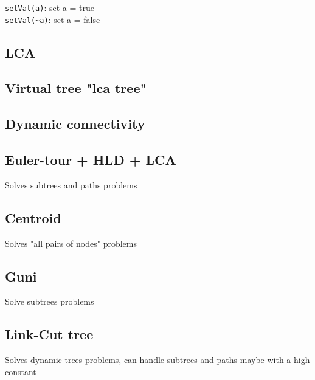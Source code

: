 \lstinline{setVal(a)}: set a = true \\
\lstinline{setVal(~a)}: set a = false \\

\subsection{LCA }

\subsection{Virtual tree  "lca tree"}


\subsection{Dynamic connectivity }

\subsection{Euler-tour + HLD + LCA }

Solves subtrees and paths problems \\


\subsection{Centroid }

Solves "all pairs of nodes" problems \\


\subsection{Guni }

Solve subtrees problems\\


\subsection{Link-Cut tree }

Solves dynamic trees problems, can handle subtrees and paths maybe with a high constant\\
